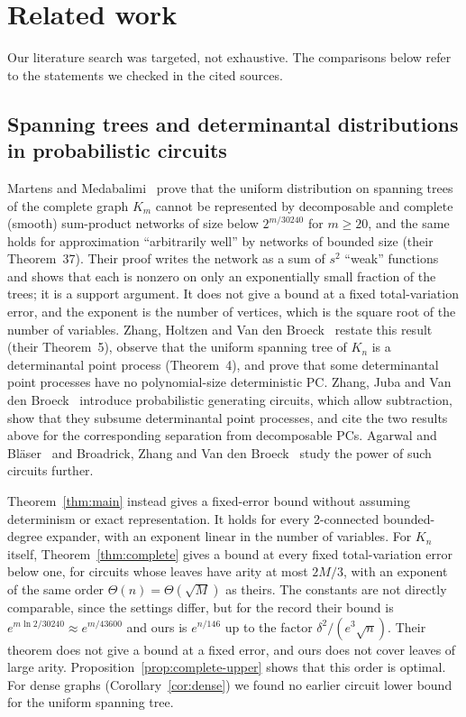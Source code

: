 \section{Related work}\label{sec:related}

Our literature search was targeted, not exhaustive. The comparisons below refer to the statements we checked in the cited sources.

\subsection{Spanning trees and determinantal distributions in probabilistic circuits}

Martens and Medabalimi~\cite{MartensMedabalimi14} prove that the uniform distribution on spanning trees of the complete graph $K_m$ cannot be represented by decomposable and complete (smooth) sum-product networks of size below $2^{m/30240}$ for $m\ge20$, and the same holds for approximation ``arbitrarily well'' by networks of bounded size (their Theorem~37). Their proof writes the network as a sum of $s^2$ ``weak'' functions and shows that each is nonzero on only an exponentially small fraction of the trees; it is a support argument. It does not give a bound at a fixed total-variation error, and the exponent is the number of vertices, which is the square root of the number of variables. Zhang, Holtzen and Van den Broeck~\cite{ZhangHoltzenVdB20} restate this result (their Theorem~5), observe that the uniform spanning tree of $K_n$ is a determinantal point process (Theorem~4), and prove that some determinantal point processes have no polynomial-size deterministic PC. Zhang, Juba and Van den Broeck~\cite{ZhangJubaVdB21} introduce probabilistic generating circuits, which allow subtraction, show that they subsume determinantal point processes, and cite the two results above for the corresponding separation from decomposable PCs. Agarwal and Bl\"aser~\cite{AgarwalBlaser24} and Broadrick, Zhang and Van den Broeck~\cite{BroadrickZhangVdB24} study the power of such circuits further.

Theorem~\ref{thm:main} instead gives a fixed-error bound without assuming determinism or exact representation. It holds for every 2-connected bounded-degree expander, with an exponent linear in the number of variables. For $K_n$ itself, Theorem~\ref{thm:complete} gives a bound at every fixed total-variation error below one, for circuits whose leaves have arity at most $2M/3$, with an exponent of the same order $\Theta(n)=\Theta(\sqrt M)$ as theirs. The constants are not directly comparable, since the settings differ, but for the record their bound is $e^{m\ln2/30240}\approx e^{m/43600}$ and ours is $e^{n/146}$ up to the factor $\delta^2/(e^3\sqrt n)$. Their theorem does not give a bound at a fixed error, and ours does not cover leaves of large arity. Proposition~\ref{prop:complete-upper} shows that this order is optimal. For dense graphs (Corollary~\ref{cor:dense}) we found no earlier circuit lower bound for the uniform spanning tree.

